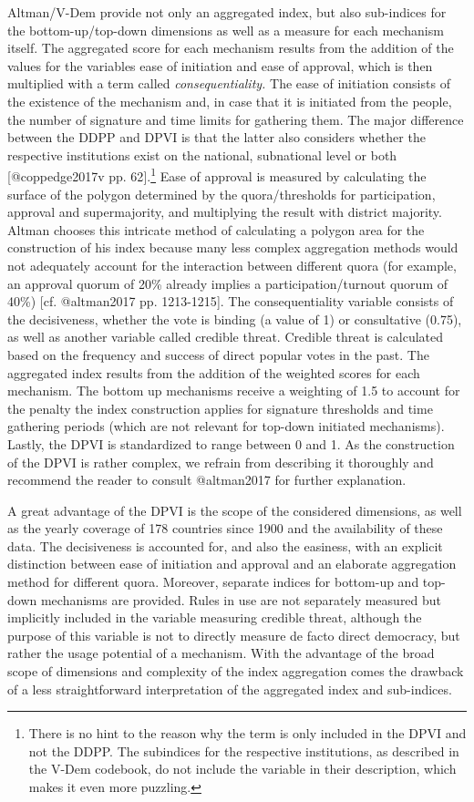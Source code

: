 \documentclass[]{article}
\let\rmarkdownfootnote\footnote%
\def\footnote{\protect\rmarkdownfootnote}
\begin{document}
Altman/V-Dem provide not only an aggregated index, but also sub-indices
for the bottom-up/top-down dimensions as well as a measure for each
mechanism itself. The aggregated score for each mechanism results from
the addition of the values for the variables ease of initiation and ease
of approval, which is then multiplied with a term called
\emph{consequentiality.} The ease of initiation consists of the
existence of the mechanism and, in case that it is initiated from the
people, the number of signature and time limits for gathering them. The
major difference between the DDPP and DPVI is that the latter also
considers whether the respective institutions exist on the national,
subnational level or both {[}@coppedge2017v pp. 62{]}.\footnote{There is
  no hint to the reason why the term is only included in the DPVI and
  not the DDPP. The subindices for the respective institutions, as
  described in the V-Dem codebook, do not include the variable in their
  description, which makes it even more puzzling.} Ease of approval is
measured by calculating the surface of the polygon determined by the
quora/thresholds for participation, approval and supermajority, and
multiplying the result with district majority. Altman chooses this
intricate method of calculating a polygon area for the construction of
his index because many less complex aggregation methods would not
adequately account for the interaction between different quora (for
example, an approval quorum of 20\% already implies a
participation/turnout quorum of 40\%) {[}cf. @altman2017 pp.
1213-1215{]}. The consequentiality variable consists of the
decisiveness, whether the vote is binding (a value of 1) or consultative
(0.75), as well as another variable called credible threat. Credible
threat is calculated based on the frequency and success of direct
popular votes in the past. The aggregated index results from the
addition of the weighted scores for each mechanism. The bottom up
mechanisms receive a weighting of 1.5 to account for the penalty the
index construction applies for signature thresholds and time gathering
periods (which are not relevant for top-down initiated mechanisms).
Lastly, the DPVI is standardized to range between 0 and 1. As the
construction of the DPVI is rather complex, we refrain from describing
it thoroughly and recommend the reader to consult @altman2017 for
further explanation.

A great advantage of the DPVI is the scope of the considered dimensions,
as well as the yearly coverage of 178 countries since 1900 and the
availability of these data. The decisiveness is accounted for, and also
the easiness, with an explicit distinction between ease of initiation
and approval and an elaborate aggregation method for different quora.
Moreover, separate indices for bottom-up and top-down mechanisms are
provided. Rules in use are not separately measured but implicitly
included in the variable measuring credible threat, although the purpose
of this variable is not to directly measure de facto direct democracy,
but rather the usage potential of a mechanism. With the advantage of the
broad scope of dimensions and complexity of the index aggregation comes
the drawback of a less straightforward interpretation of the aggregated
index and sub-indices.
\end{document}
